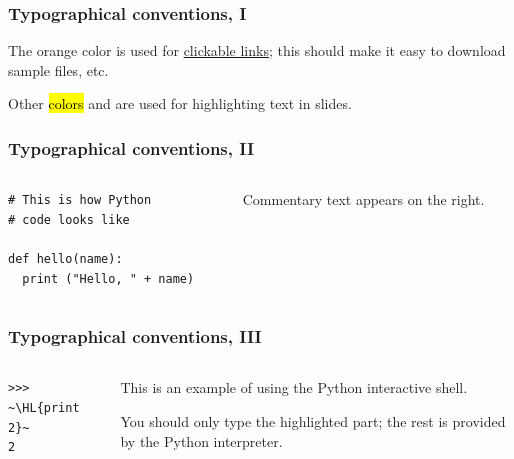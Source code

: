 \documentclass[english,serif,mathserif,xcolor=pdftex,dvipsnames,table]{beamer}
\begin{document}
\begin{frame}
  \frametitle{Typographical conventions, I}

  The orange color is used for
  \href{http://www.gc3.uzh.ch/}{clickable
    links}; this should make it easy to download sample files, etc.

  \+
  Other \hl{colors} and  are used for highlighting
  text in slides.
\end{frame}


\begin{frame}[fragile]
  \frametitle{Typographical conventions, II}

    \begin{columns}[t]
    \begin{column}{0.5\textwidth}
\begin{lstlisting}
# This is how Python
# code looks like

def hello(name):
  print ("Hello, " + name)
\end{lstlisting}
    \end{column}
    \begin{column}{0.5\textwidth}
      \raggedleft Commentary text appears on the right.
    \end{column}
  \end{columns}
\end{frame}


\begin{frame}[fragile]
  \frametitle{Typographical conventions, III}

    \begin{columns}[t]
    \begin{column}{0.5\textwidth}
\begin{lstlisting}
>>> ~\HL{print 2}~
2
\end{lstlisting}
    \end{column}
    \begin{column}{0.5\textwidth}
      \raggedleft
      This is an example of using the Python interactive shell.

      \+
      You should only type the highlighted part; the rest is
      provided by the Python interpreter.
    \end{column}
  \end{columns}
\end{frame}
\end{document}
